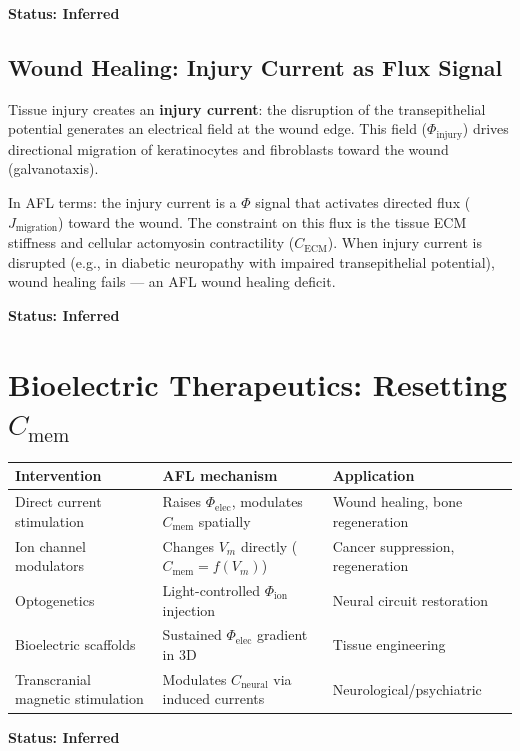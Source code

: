 \documentclass[12pt,a4paper]{article}
\begin{document}
\textbf{Status: Inferred}

\subsection{Wound Healing: Injury Current as Flux Signal}

Tissue injury creates an \textbf{injury current}: the disruption of the transepithelial potential generates an electrical field at the wound edge. This field ($\Phi_{\mathrm{injury}}$) drives directional migration of keratinocytes and fibroblasts toward the wound (galvanotaxis).

In AFL terms: the injury current is a $\Phi$ signal that activates directed flux ($J_{\mathrm{migration}}$) toward the wound. The constraint on this flux is the tissue ECM stiffness and cellular actomyosin contractility ($C_{\mathrm{ECM}}$). When injury current is disrupted (e.g., in diabetic neuropathy with impaired transepithelial potential), wound healing fails --- an AFL wound healing deficit.

\textbf{Status: Inferred}

\section{Bioelectric Therapeutics: Resetting $C_{\mathrm{mem}}$}

\begin{center}
\begin{tabular}{lll}
\toprule
Intervention & AFL mechanism & Application \\
\midrule
Direct current stimulation & Raises $\Phi_{\mathrm{elec}}$, modulates $C_{\mathrm{mem}}$ spatially & Wound healing, bone regeneration \\
Ion channel modulators & Changes $V_m$ directly ($C_{\mathrm{mem}} = f(V_m)$) & Cancer suppression, regeneration \\
Optogenetics & Light-controlled $\Phi_{\mathrm{ion}}$ injection & Neural circuit restoration \\
Bioelectric scaffolds & Sustained $\Phi_{\mathrm{elec}}$ gradient in 3D & Tissue engineering \\
Transcranial magnetic stimulation & Modulates $C_{\mathrm{neural}}$ via induced currents & Neurological/psychiatric \\
\bottomrule
\end{tabular}
\end{center}

\textbf{Status: Inferred}
\end{document}
